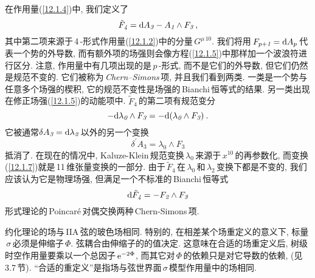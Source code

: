 在作用量(\ref{12.1.4})中, 我们定义了
\begin{equation}
    \tilde{F}_{\textit{4}}= \mathrm{d} A_{\textit{3}}-A_{\textit{1}}\wedge F_{\textit{3}} \:, \label{12.1.5}
\end{equation}
其中第二项来源于\,4\,-形式作用量(\ref{12.1.2})中的分量$\,G^{\mu\,10}$. 我们将用$\,F_{p+\textit{1}}=\mathrm{d} A_{p}\,$代表一个势的外导数, 而有额外项的场强则会像方程(\ref{12.1.5})中那样加一个波浪符进行区分. 注意, 作用量中有几项出现的是$\,p\,$-形式, 而不是它们的外导数, 但它们仍然是规范不变的. 它们被称为\,\textit{Chern--Simons}\,项, 并且我们看到两类. 一类是一个势与任意多个场强的楔积, 它的规范不变性是场强的\,Bianchi\,恒等式的结果. 另一类出现在修正场强(\ref{12.1.5})的动能项中. $\tilde{F}_{\textit{4}}\,$的第二项有规范变分
\begin{equation}
    {-}\mathrm{d}\lambda_{\textit{0}} \wedge F_{\textit{3}} = - \mathrm{d}(\lambda_{\textit{0}}\wedge F_{\textit{3}}) \:. \label{12.1.6}
\end{equation}
它被通常$\delta A_{\textit{3}}=\mathrm{d}\lambda_{\textit{2}}\,$以外的另一个变换
\begin{equation}
    \delta^{\prime}A_{\textit{3}}=\lambda_{\textit{0}}\wedge F_{\textit{3}} \label{12.1.7}
\end{equation}
抵消了. 在现在的情况中, Kaluze-Klein\,规范变换$\,\lambda_{\textit{0}}\,$来源于$\,x^{10}\,$的再参数化, 而变换(\ref{12.1.7})就是\,11\,维张量变换的一部分. 由于$\,\tilde{F}_{\textit{4}}\,$在$\,\lambda_{\textit{0}}\,$和$\,\lambda_{\textit{2}}\,$变换下都是不变的, 我们应该认为它是物理场强, 但满足一个不标准的\,Bianchi\,恒等式
\begin{equation}
    \mathrm{d} \tilde{F}_{\textit{4}}=-F_{\textit{2}}\wedge F_{\textit{3}}
\end{equation}
形式理论的\,Poincar\'{e}\,对偶交换两种\,Chern-Simons\,项.

约化理论的场与\,IIA\,弦的玻色场相同. 特别的, 在相差某个场重定义的意义下, 标量$\,\sigma\,$必须是伸缩子$\,\Phi$. 弦耦合由伸缩子的的值决定. 这意味在合适的场重定义后, 树级时空作用量要乘以一个总因子$\,\mathrm{e}^{-2\Phi}$, 而其它对$\,\Phi\,$的依赖只是对它导数的依赖, (见\,3.7\,节). ``合适的重定义''是指场与弦世界面\,$\sigma\,$模型作用量中的场相同.


